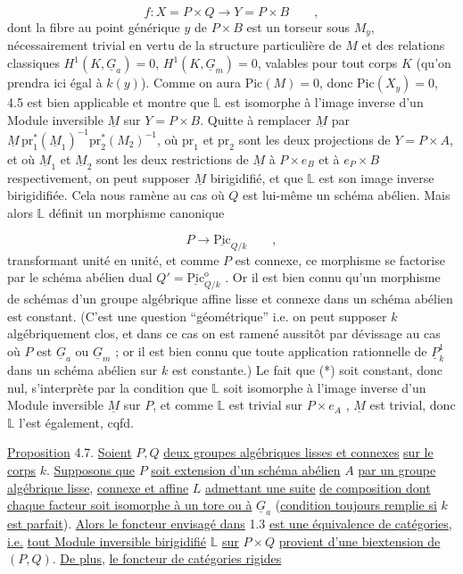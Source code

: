 \begin{equation*}
f : X = P \times Q \longrightarrow Y = P \times B \qquad ,
\end{equation*}
dont la fibre au point générique $y$ de $P \times B$ est un torseur sous $M_y$, nécessairement trivial en vertu de la structure particulière de $M$ et des relations classiques $H^1(K,\underline{G}_a) = 0$, $H^1(K,\underline{G}_m) = 0$, valables pour tout corps $K$ (qu'on prendra ici égal à $k(y)$). Comme on aura $\mathrm{Pic}(M) = 0$, donc $\mathrm{Pic}(X_y) = 0$, 4.5 est bien applicable et montre que $\mathbb{L}$ est isomorphe à l'image inverse d'un Module inversible $\underline{M}$ sur $Y = P \times B$. Quitte à remplacer $\underline{M}$ par $\underline{M}\,\mathrm{pr}_1^*(\underline{M}_1)^{-1}\mathrm{pr}_2^*(M_2)^{-1}$, où $\mathrm{pr}_1$ et $\mathrm{pr}_2$ sont les deux projections de $Y=P \times A$, et où $\underline{M}_1$ et $\underline{M}_2$ sont les deux restrictions de $\underline{M}$ à $P \times e_B$ et à $e_P \times B$ respectivement, on peut supposer $\underline{M}$ birigidifié, et que $\mathbb{L}$ est son image inverse birigidifiée. Cela nous ramène au cas où $Q$ est lui-même un schéma abélien. Mais alors $\mathbb{L}$ définit un morphisme canonique

\begin{equation}\tag{*}
P \longrightarrow \underline{\mathrm{Pic}}_{Q/k} \qquad ,
\end{equation}
transformant unité en unité, et comme $P$ est connexe, ce morphisme se
factorise par le schéma abélien dual $Q' = \underline{\mathrm{Pic}}^{\mathrm{o}}_{Q/k}$ . Or il est bien connu qu'un morphisme de schémas d'un groupe algébrique affine lisse et connexe dans un schéma abélien est constant. (C'est une question ``géométrique'' i.e. on peut supposer $k$ algébriquement clos, et dans ce cas on est ramené aussitôt par dévissage au cas où $P$ est $\underline{G}_a$ ou $\underline{G}_m$ ; or il est bien connu que toute application rationnelle de $\underline{P}^1_k$ dans un schéma abélien sur $k$ est constante.) Le fait que (*) soit constant, donc nul, s'interprète par la condition que $\mathbb{L}$ soit isomorphe à l'image inverse d'un Module inversible $\underline{M}$ sur $P$, et comme $\mathbb{L}$ est trivial sur $P \times e_A$ , $\underline{M}$ est trivial, donc $\mathbb{L}$ l'est également, cqfd.

\underline{Proposition} 4.7. \underline{Soient} $P,Q$ \underline{deux groupes algébriques lisses et connexes} \underline{sur le corps} $k$. \underline{Supposons que} $P$ \underline{soit extension d'un schéma abélien} $A$ \underline{par un groupe algébrique lisse}, \underline{connexe et affine} $L$ \underline{admettant une suite} \underline{de composition dont chaque facteur soit isomorphe à un tore ou à} $\underline{G}_a$ (\underline{condition toujours remplie si} $k$ \underline{est parfait}). \underline{Alors le foncteur envisagé dans} 1.3 \underline{est une équivalence de catégories}, \underline{i.e.} \underline{tout Module inversible birigidifié} $\mathbb{L}$ \underline{sur} $P \times Q$ \underline{provient d'une biextension de} $(P,Q)$. \underline{De plus}, \underline{le foncteur de catégories rigides}

